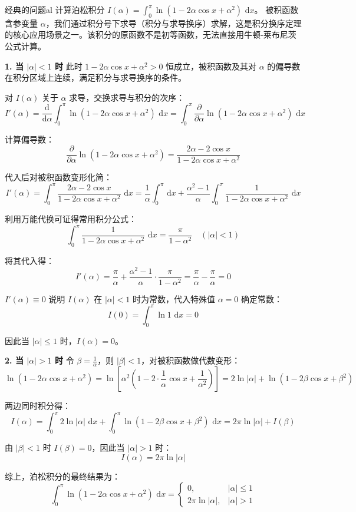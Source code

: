 \documentclass[UTF8,zihao=-4,openany]{ctexbook}
\newcommand{\dd}{\,\mathrm{d}}
\begin{document}
\begin{example}{经典的问题}{al}
计算泊松积分 $\displaystyle I(\alpha) = \int_{0}^{\pi}\ln(1-2\alpha \cos x+\alpha^2)\,\dd x$。
\tcblower
被积函数含参变量 $\alpha$，我们通过积分号下求导（积分与求导换序）求解，这是积分换序定理的核心应用场景之一。该积分的原函数不是初等函数，无法直接用牛顿-莱布尼茨公式计算。

\textbf{1. 当 $|\alpha| < 1$ 时}
此时 $1-2\alpha \cos x+\alpha^2 > 0$ 恒成立，被积函数及其对 $\alpha$ 的偏导数在积分区域上连续，满足积分与求导换序的条件。

对 $I(\alpha)$ 关于 $\alpha$ 求导，交换求导与积分的次序：
$$
I'(\alpha) = \frac{\mathrm{d}}{\mathrm{d}\alpha}\int_{0}^{\pi}\ln(1-2\alpha \cos x+\alpha^2)\,\dd x
= \int_{0}^{\pi} \frac{\partial}{\partial\alpha}\ln(1-2\alpha \cos x+\alpha^2)\,\dd x
$$

计算偏导数：
$$
\frac{\partial}{\partial\alpha}\ln(1-2\alpha \cos x+\alpha^2) = \frac{2\alpha - 2\cos x}{1-2\alpha \cos x+\alpha^2}
$$

代入后对被积函数变形化简：
$$
I'(\alpha) = \int_{0}^{\pi} \frac{2\alpha - 2\cos x}{1-2\alpha \cos x+\alpha^2}\,\dd x
= \frac{1}{\alpha}\int_{0}^{\pi}\dd x + \frac{\alpha^2 - 1}{\alpha}\int_{0}^{\pi} \frac{1}{1-2\alpha \cos x+\alpha^2}\,\dd x
$$

利用万能代换可证得常用积分公式：
$$\int_{0}^{\pi} \frac{1}{1-2\alpha \cos x+\alpha^2}\,\dd x = \frac{\pi}{1-\alpha^2} \quad (|\alpha|<1)$$

将其代入得：
$$
I'(\alpha) = \frac{\pi}{\alpha} + \frac{\alpha^2 - 1}{\alpha}\cdot\frac{\pi}{1-\alpha^2} = \frac{\pi}{\alpha} - \frac{\pi}{\alpha} = 0
$$

$I'(\alpha)\equiv0$ 说明 $I(\alpha)$ 在 $|\alpha|<1$ 时为常数，代入特殊值 $\alpha=0$ 确定常数：
$$
I(0) = \int_{0}^{\pi}\ln 1\,\dd x = 0
$$

因此当 $|\alpha| \le 1$ 时，$\displaystyle I(\alpha) = 0$。

\textbf{2. 当 $|\alpha| > 1$ 时}
令 $\displaystyle\beta = \frac{1}{\alpha}$，则 $|\beta| < 1$，对被积函数做代数变形：
$$
\ln(1-2\alpha \cos x+\alpha^2) = \ln\left[\alpha^2\left(1 - 2\cdot\frac{1}{\alpha}\cos x + \frac{1}{\alpha^2}\right)\right]
= 2\ln|\alpha| + \ln(1-2\beta \cos x+\beta^2)
$$

两边同时积分得：
$$
I(\alpha) = \int_{0}^{\pi}2\ln|\alpha|\,\dd x + \int_{0}^{\pi}\ln(1-2\beta \cos x+\beta^2)\,\dd x
= 2\pi\ln|\alpha| + I(\beta)
$$

由 $|\beta|<1$ 时 $I(\beta)=0$，因此当 $|\alpha| > 1$ 时：
$$
I(\alpha) = 2\pi\ln|\alpha|
$$

综上，泊松积分的最终结果为：
$$
\int_{0}^{\pi}\ln(1-2\alpha \cos x+\alpha^2)\,\dd x =
\begin{cases}
0, & |\alpha| \le 1 \\
2\pi\ln|\alpha|, & |\alpha| > 1
\end{cases}
$$
\end{example}
\end{document}
